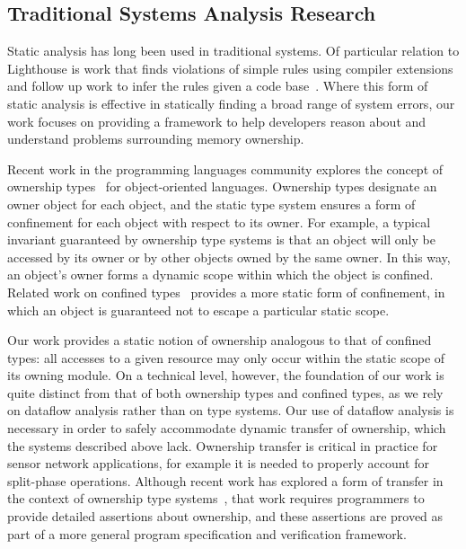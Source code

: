 \subsection{Traditional Systems Analysis Research}



Static analysis has long been used in traditional systems.
%
Of particular relation to Lighthouse is work that finds violations of simple
rules using compiler extensions~\cite{engler00checking} and
follow up work to infer the rules given a code base~\cite{kremenek06from}.
%
Where this form of static analysis is effective in statically finding a broad
range of system errors, our work focuses on providing a framework to help
developers reason about and understand problems surrounding memory
ownership.
%



Recent work in the programming languages community explores the concept of
ownership types~\cite{ownership,ownership2,BoyapatiEtAl02,aliasjava} for
object-oriented languages. 
%
Ownership types designate an owner object for each object, and the static
type system ensures a form of confinement for each object with respect to
its owner.  
%
For example, a typical invariant guaranteed by ownership type systems is
that an object will only be accessed by its owner or by other objects owned
by the same owner.  
%
In this way, an object's owner forms a dynamic scope within which the object
is confined.  
%
Related work on confined types~\cite{confined1,confined2} provides a more
static form of confinement, in which an object is guaranteed not to escape a
particular static scope.



Our work provides a static notion of ownership analogous to that of confined
types:  all accesses to a given resource may only occur within the static
scope of its owning module.  
%
On a technical level, however, the foundation of our work is quite distinct
from that of both ownership types and confined types, as we rely on dataflow
analysis rather than on type systems.  
%
Our use of dataflow analysis is necessary in order to safely accommodate
dynamic transfer of ownership, which the systems described above lack.  
%
Ownership transfer is critical in practice for sensor network applications,
for example it is needed to properly account for split-phase operations.  
%
Although recent work has explored a form of transfer in the context of
ownership type systems~\cite{DBLP:conf/ecoop/BanerjeeN05}, that work
requires programmers to provide detailed assertions about ownership, and
these assertions are proved as part of a more general program specification
and verification framework.



